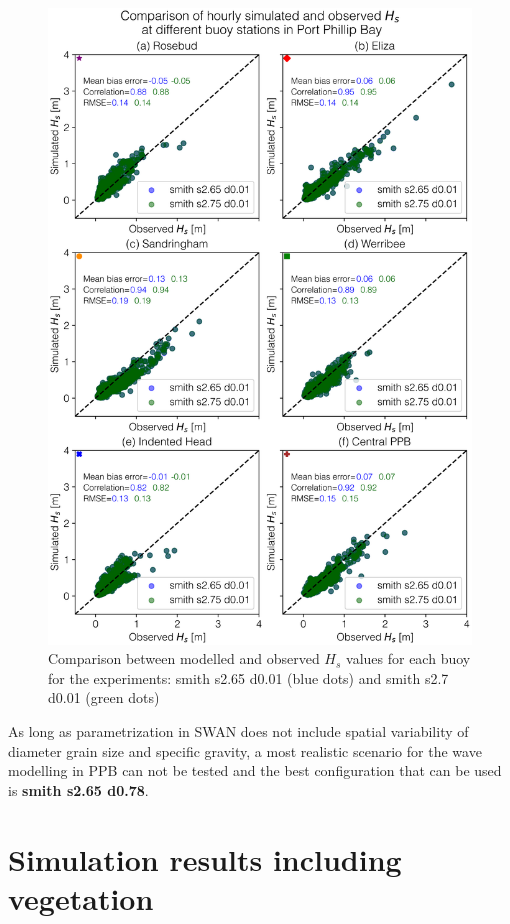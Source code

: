 \documentclass[12pt]{article}
\begin{document}
\begin{figure}[H]
    \centering
    \includegraphics[scale=0.7]{plots/scatter/smith s2.65 d0.01_vs_smith s2.75 d0.01_vert_sca.png}
    \caption{Comparison between modelled and observed $H_{s}$ values for each buoy for the experiments: smith s2.65 d0.01 (blue dots) and smith s2.7 d0.01 (green dots)}
    \label{fig:scatter_smith_s2.65_vs_smith_s2.75}
\end{figure}

As long as \textcite{Smith2011} parametrization in SWAN does not include spatial variability of diameter grain size and specific gravity, a most realistic scenario for the wave modelling in PPB can not be tested and the best configuration that can be used is \textbf{smith s2.65 d0.78}. 

\section{Simulation results including vegetation}
\end{document}
